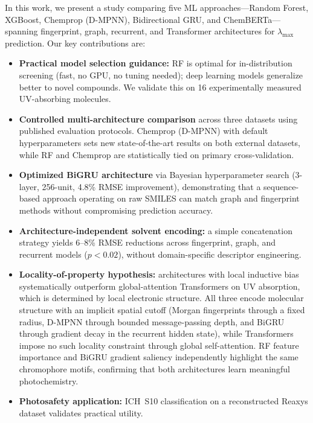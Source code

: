 In this work, we present a study comparing five ML approaches---Random Forest, XGBoost, Chemprop (D-MPNN), Bidirectional GRU, and ChemBERTa---spanning fingerprint, graph, recurrent, and Transformer architectures for $\lambda_{\max}$ prediction.
Our key contributions are:
\begin{itemize}
    \item \textbf{Practical model selection guidance:} RF is optimal for in-distribution screening (fast, no GPU, no tuning needed); deep learning models generalize better to novel compounds. We validate this on 16 experimentally measured UV-absorbing molecules.
    \item \textbf{Controlled multi-architecture comparison} across three datasets using published evaluation protocols. Chemprop (D-MPNN) with default hyperparameters sets new state-of-the-art results on both external datasets, while RF and Chemprop are statistically tied on primary cross-validation.
    \item \textbf{Optimized BiGRU architecture} via Bayesian hyperparameter search (3-layer, 256-unit, 4.8\% RMSE improvement), demonstrating that a sequence-based approach operating on raw SMILES can match graph and fingerprint methods without compromising prediction accuracy.
    \item \textbf{Architecture-independent solvent encoding:} a simple concatenation strategy yields 6--8\% RMSE reductions across fingerprint, graph, and recurrent models ($p < 0.02$), without domain-specific descriptor engineering.
    \item \textbf{Locality-of-property hypothesis:} architectures with local inductive bias systematically outperform global-attention Transformers on UV absorption, which is determined by local electronic structure\cite{chenMolecularLanguage2023}. All three encode molecular structure with an implicit spatial cutoff (Morgan fingerprints through a fixed radius, D-MPNN through bounded message-passing depth, and BiGRU through gradient decay in the recurrent hidden state), while Transformers impose no such locality constraint through global self-attention. RF feature importance and BiGRU gradient saliency independently highlight the same chromophore motifs, confirming that both architectures learn meaningful photochemistry.
    \item \textbf{Photosafety application:} ICH~S10 classification on a reconstructed Reaxys dataset validates practical utility.
\end{itemize}

